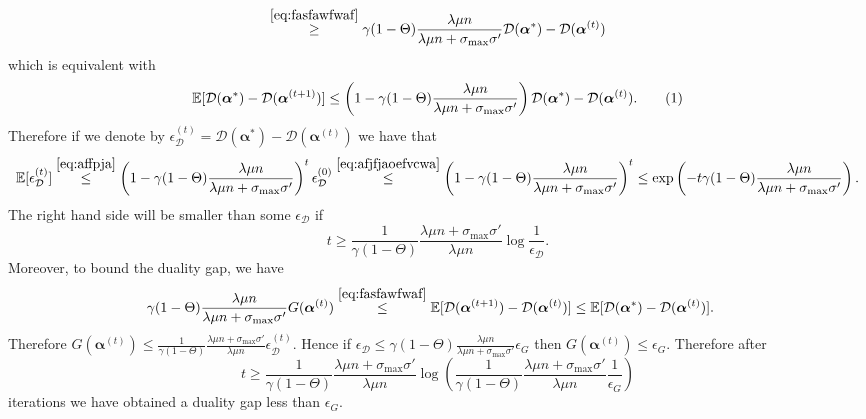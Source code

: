 \documentclass{article}
\newcommand{\Exp}{\mathbb{E}}                      %
\newcommand\tagthis{\addtocounter{equation}{1}\tag{\theequation}}
\newcommand{\calG}{G}
\newcommand{\alphav}{ {\boldsymbol \alpha}}
\newcommand{\0}{ {\bf 0}}
\newcommand{\vc}[2]{#1^{(#2)}}                   %
\newcommand{\bD}{\mathcal{D}}
\theoremstyle{plain}
\theoremstyle{definition}
\begin{document}
{\begin{align*}
\overset{
\eqref{eq:fasfawfwaf}}
{
\geq
}
\gamma
(1-\Theta)
 \frac{ \lambda\mu n }
      {\lambda\mu n+
\sigma_{\max} \sigma'} \bD(\alphav^*)-\bD(\vc{\alphav}{t})
\end{align*}
which is equivalent with
\begin{align*}
\Exp[\bD(\alphav^*)-\bD(\vc{\alphav}{t+1})]
\leq 
\left(
1-\gamma
(1-\Theta)
 \frac{ \lambda\mu n }
      {\lambda\mu n+
\sigma_{\max} \sigma'}\right)
\bD(\alphav^*)-\bD(\vc{\alphav}{t}).
\tagthis \label{eq:affpja}
\end{align*}
Therefore if we denote by $\vc{\epsilon_\bD}{t} = \bD(\alphav^*)-\bD(\vc{\alphav}{t})$
we have that
\begin{align*}
 \Exp[\vc{\epsilon_\bD}{t}] 
 \overset{\eqref{eq:affpja}}{\leq}   \left(
 1-\gamma
(1-\Theta)
 \frac{ \lambda\mu n }
      {\lambda\mu n+
\sigma_{\max} \sigma'}
   \right)^t \vc{\epsilon_\bD}{0}
\overset{\eqref{eq:afjfjaoefvcwa}}{\leq}
\left(
 1-\gamma
(1-\Theta)
 \frac{ \lambda\mu n }
      {\lambda\mu n+
\sigma_{\max} \sigma'}
   \right)^t
\leq \exp\left(-t \gamma
(1-\Theta)
 \frac{ \lambda\mu n }
      {\lambda\mu n+
\sigma_{\max} \sigma'}
     \right).
\end{align*}
The right hand side will be smaller than some $\epsilon_\bD$ if 
$$
 t   
    \geq 
\frac{1}
   {\gamma
(1-\Theta)}
\frac
{\lambda\mu n+
\sigma_{\max} \sigma'}
{ \lambda\mu n }
    \log \frac1{\epsilon_\bD}.
$$
Moreover, to bound the duality gap, we have
\begin{align*}
\gamma
(1-\Theta)
 \frac{ \lambda\mu n }
      {\lambda\mu n+
\sigma_{\max} \sigma'} G(\vc{\alphav}{t})
&
\overset{
\eqref{eq:fasfawfwaf}
}{\leq}
\Exp[
\bD(\vc{\alphav}{t+1})
-
\bD(\vc{\alphav}{t})
 ]
\leq 
\Exp[
\bD(\alphav^*)
-
\bD(\vc{\alphav}{t})
 ]. 
\end{align*}
Therefore  $\calG(\vc{\alphav}{t})\leq 
\frac1{
\gamma
(1-\Theta)}
 \frac      {\lambda\mu n+
\sigma_{\max} \sigma'} 
{ \lambda\mu n }    \vc{\epsilon_\bD}{t}$.  
Hence if $\epsilon_\bD \leq 
\gamma
(1-\Theta)
 \frac{ \lambda\mu n }
      {\lambda\mu n+
\sigma_{\max} \sigma'} 
 \epsilon_\calG $
then $\calG(\vc{\alphav}{t})\leq \epsilon_\calG$.
Therefore
after 
$$
 t   
    \geq 
\frac{1}
   {\gamma
(1-\Theta)}
\frac
{\lambda\mu n+
\sigma_{\max} \sigma'}
{ \lambda\mu n }
    \log 
\left(
\frac{1}
   {\gamma
(1-\Theta)}
\frac
{\lambda\mu n+
\sigma_{\max} \sigma'}
{ \lambda\mu n }
    \frac1{\epsilon_\calG}
    \right) 
$$
iterations we have obtained a duality gap less than $\epsilon_\calG$.
 


}
\end{document}
